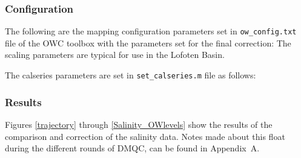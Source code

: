 \documentclass{article}
\begin{document}
\subsubsection{Configuration}\label{Configuration1}
%  
The following are the mapping configuration parameters set in
\texttt{ow\_config.txt} file of the OWC toolbox with the parameters set
for the final correction:  
The scaling parameters are typical for use in the Lofoten Basin. %

The calseries parameters are set in \texttt{set\_calseries.m} file as
follows: 


\subsubsection{Results}\label{results_CTDArgo}
Figures \ref{trajectory} through \ref{Salinity_OWlevels} show the results
of the comparison and correction of the salinity data.
%
Notes made about this float during the different rounds of DMQC, can be
found in Appendix~A.
\end{document}
